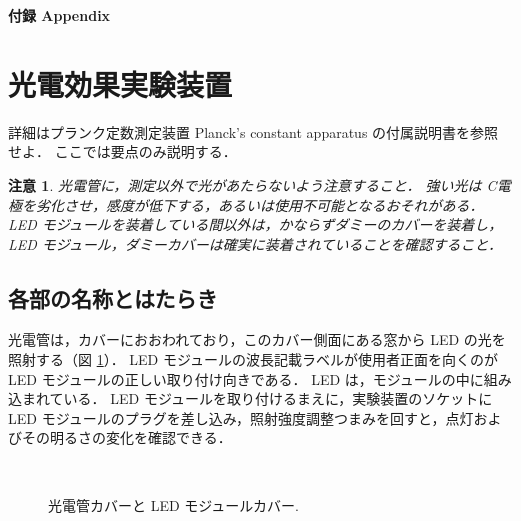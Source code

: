 \documentclass[11pt,sort]{jarticle}
\newtheorem{caution}{注意}
\begin{document}




\newpage
\appendix
\noindent
{\LARGE\bf 付録 Appendix}

\section{光電効果実験装置}\label{apdx:aparatus}

詳細はプランク定数測定装置 Planck's constant apparatus の付属説明書を参照せよ．
ここでは要点のみ説明する．

\begin{caution}
光電管に，測定以外で光があたらないよう注意すること．
強い光は C電極を劣化させ，感度が低下する，あるいは使用不可能となるおそれがある．
LED モジュールを装着している間以外は，かならずダミーのカバーを装着し，
LED モジュール，ダミーカバーは確実に装着されていることを確認すること．
\end{caution}

\subsection{各部の名称とはたらき}

光電管は，カバーにおおわれており，このカバー側面にある窓から LED の光を照射する（図 \ref{fig:phototube_cover}）．
LED モジュールの波長記載ラベルが使用者正面を向くのが LED モジュールの正しい取り付け向きである．
LED は，モジュールの中に組み込まれている．
LED モジュールを取り付けるまえに，実験装置のソケットに LED モジュールのプラグを差し込み，照射強度調整つまみを回すと，点灯およびその明るさの変化を確認できる．

\begin{figure}[t]
\begin{center}
\\
\caption{光電管カバーと LED モジュールカバー. }\label{fig:phototube_cover} 
\end{center}
\end{figure}
\end{document}
